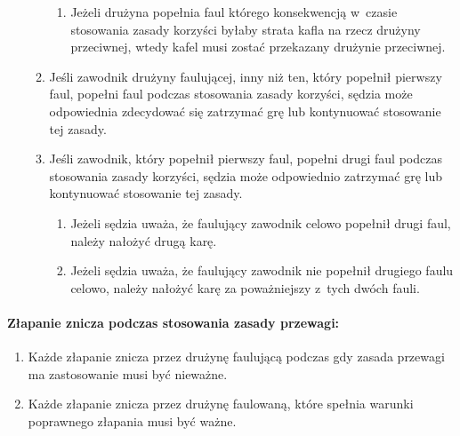 \documentclass[12pt]{article}
\begin{document}
\begin{enumerate}
\begin{enumerate}
		            \begin{enumerate}
			            \item
			                  Jeżeli drużyna popełnia faul którego konsekwencją w~czasie
			                  stosowania zasady korzyści byłaby strata kafla na rzecz drużyny
			                  przeciwnej, wtedy kafel musi zostać przekazany drużynie
			                  przeciwnej.
		            \end{enumerate}
		      \item
		            Jeśli zawodnik drużyny faulującej, inny niż ten, który popełnił
		            pierwszy faul, popełni faul podczas stosowania zasady korzyści,
		            sędzia może odpowiednia zdecydować się zatrzymać grę lub kontynuować
		            stosowanie tej zasady.
		      \item
		            Jeśli zawodnik, który popełnił pierwszy faul, popełni drugi faul
		            podczas stosowania zasady korzyści, sędzia może odpowiednio
		            zatrzymać grę lub kontynuować stosowanie tej zasady.

		            \begin{enumerate}
			            \item
			                  Jeżeli sędzia uważa, że faulujący zawodnik celowo popełnił drugi
			                  faul, należy nałożyć drugą karę.
			            \item
			                  Jeżeli sędzia uważa, że faulujący zawodnik nie popełnił drugiego
			                  faulu celowo, należy nałożyć karę za poważniejszy z~tych dwóch
			                  fauli.
		            \end{enumerate}
	      \end{enumerate}
\end{enumerate}

\paragraph{Złapanie znicza podczas stosowania zasady przewagi:}

\begin{enumerate}
	\item
	      Każde złapanie znicza przez drużynę faulującą podczas gdy zasada
	      przewagi ma zastosowanie musi być nieważne.
	\item
	      Każde złapanie znicza przez drużynę faulowaną, które spełnia warunki
	      poprawnego złapania musi być ważne.
\end{enumerate}
\end{document}
